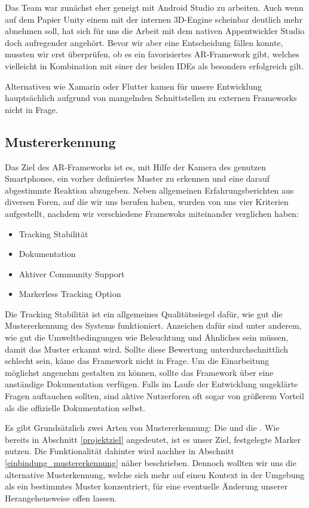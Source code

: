 Das Team war zunächst eher geneigt mit Android Studio zu arbeiten. Auch wenn auf dem Papier Unity einem mit der internen 3D-Engine scheinbar deutlich mehr abnehmen soll, hat sich für uns die Arbeit mit dem nativen Appentwickler Studio doch aufregender angehört. Bevor wir aber eine Entscheidung fällen konnte, mussten wir erst überprüfen, ob es ein favorisiertes AR-Framework gibt, welches vielleicht in Kombination mit einer der beiden IDEs als besonders erfolgreich gilt.

Alternativen wie Xamarin oder Flutter kamen für unsere Entwicklung hauptsächlich aufgrund von mangelnden Schnittstellen zu externen Frameworks nicht in Frage.
\subsection{Mustererkennung}
Das Ziel des AR-Frameworks ist es, mit Hilfe der Kamera des genutzen Smartphones, ein vorher definiertes Muster zu erkennen und eine darauf abgestimmte Reaktion abzugeben. Neben allgemeinen Erfahrungsberichten aus diversen Foren, auf die wir uns berufen haben, wurden von uns vier Kriterien aufgestellt, nachdem wir verschiedene Framewoks miteinander verglichen haben:
\begin{itemize}
\item Tracking Stabilität
\item Dokumentation
\item Aktiver Community Support
\item Markerless Tracking Option
\end{itemize}
Die Tracking Stabilität ist ein allgemeines Qualitätssiegel dafür, wie gut die Mustererkennung des Systems funktioniert. Anzeichen dafür sind unter anderem, wie gut die Umweltbedingungen wie Beleuchtung und Ähnliches sein müssen, damit das Muster erkannt wird. Sollte diese Bewertung unterdurchschnittlich schlecht sein, käme das Framework nicht in Frage.
Um die Einarbeitung möglichst angenehm gestalten zu können, sollte das Framework über eine anständige Dokumentation verfügen.
Falls im Laufe der Entwicklung ungeklärte Fragen auftauchen sollten, sind aktive Nutzerforen oft sogar von größerem Vorteil als die offizielle Dokumentation selbst. 

Es gibt Grundsätzlich zwei Arten von Mustererkennung: Die  und die . Wie bereits in Abschnitt \ref{projektziel} angedeutet, ist es unser Ziel, festgelegte Marker nutzen. Die Funktionalität dahinter wird nachher in Abschnitt \ref{einbindung_mustererkennung} näher beschrieben. Dennoch wollten wir uns die alternative  Musterkennung, welche sich mehr auf einen Kontext in der Umgebung als ein bestimmtes Muster konzentriert, für eine eventuelle Änderung unserer Herangehensweise offen lassen.

